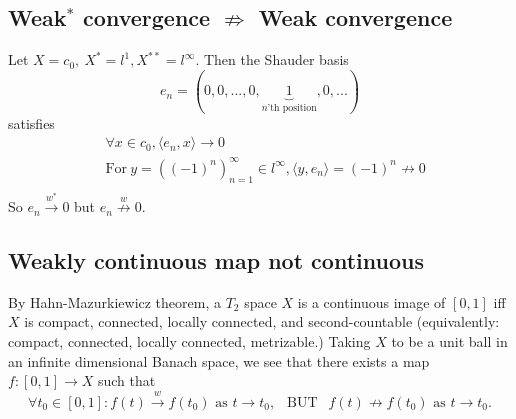 \documentclass[12pt,a4paper]{article}
\renewcommand\:{\colon}
\begin{document}
\subsection{Weak$^*$ convergence $\not \Rightarrow$ Weak convergence}
Let $X=c_0, \ X^{*}=l^{1}, X^{**}=l^{\infty}.$ Then the Shauder basis
\begin{equation*}
	e_n = (0, 0, ..., 0, \underbrace{1}_{n\text{'th position}}, 0, ...)
\end{equation*}
satisfies
\begin{align*}
	&\forall x\in c_0, \langle e_n, x\rangle \to 0\\
	&\text{For}\ y=( (-1)^{n})_{n=1}^{\infty}\in l^{\infty}, \langle y, e_n\rangle =(-1)^{n} \not\to 0\\
\end{align*}
So $e_n \stackrel{w^{*}}{\to} 0$ but $e_n\stackrel{w}{\not\to} 0.$

\subsection{Weakly continuous map not continuous}
By Hahn-Mazurkiewicz theorem, a $T_2$ space $X$ is a continuous image of $[0,1]$ iff $X$ is compact, connected, locally connected, and second-countable (equivalently: compact, connected, locally connected, metrizable.) Taking $X$ to be a unit ball in an infinite dimensional Banach space, we see that there exists a map $f\:[0,1] \to X$ such that
\begin{equation*}
	\forall t_0\in [0,1]\: f(t)\stackrel{w}{\to}f(t_0) \text{ as } t\to t_0, \ \ \text{ BUT }\ \ f(t)\not\to f(t_0) \text{ as }t\to t_0.
\end{equation*}
\end{document}
